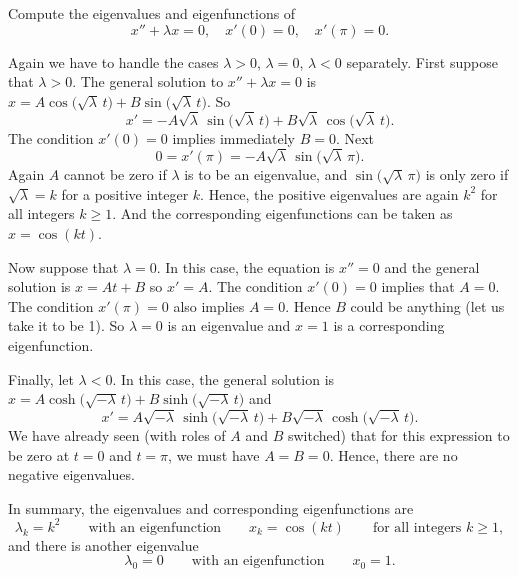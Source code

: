 \begin{example}
Compute the eigenvalues and eigenfunctions of
\begin{equation*}
x'' + \lambda x = 0, \quad x'(0) = 0, \quad x'(\pi) = 0 .
\end{equation*}

Again we have to handle the cases $\lambda > 0$, $\lambda = 0$, $\lambda
< 0$ separately.
First suppose that $\lambda > 0$.
The general solution to $x''+\lambda x = 0$ is
$x = A \cos \bigl( \sqrt{\lambda}\, t\bigr) + B \sin \bigl( \sqrt{\lambda}\,
t\bigr)$.
So
\begin{equation*}
x' = -A\sqrt{\lambda}\, \sin \bigl( \sqrt{\lambda}\, t\bigr) +
B\sqrt{\lambda}\, \cos \bigl(\sqrt{\lambda}\, t\bigr) .
\end{equation*}
The condition $x'(0) = 0$ implies immediately $B = 0$.
Next
\begin{equation*}
0 = x'(\pi) = -A\sqrt{\lambda}\, \sin \bigl( \sqrt{\lambda}\, \pi\bigr) .
\end{equation*}
Again $A$ cannot be zero if $\lambda$ is to be an eigenvalue,
and $\sin \bigl( \sqrt{\lambda}\, \pi\bigr)$ is only zero
if
$\sqrt{\lambda} = k$ for a positive integer $k$.
Hence, the positive eigenvalues are again
$k^2$ for all integers $k \geq 1$.  And the corresponding eigenfunctions
can be taken as $x=\cos (k t)$.

Now suppose that $\lambda = 0$.  In this case, the equation is $x'' = 0$
and the general solution is $x = At + B$ so $x' = A$.  The condition
$x'(0) = 0$ implies that
$A=0$.  The condition $x'(\pi) = 0$ also implies $A=0$.
Hence $B$ could be anything (let us take it to be 1).  So $\lambda = 0$
is an eigenvalue and $x=1$ is a corresponding eigenfunction.

Finally, let $\lambda < 0$.  In this case, the general solution is
$x = A \cosh \bigl( \sqrt{-\lambda}\, t\bigr)
+ B \sinh \bigl( \sqrt{-\lambda}\, t\bigr)$
and
\begin{equation*}
x' = A\sqrt{-\lambda}\, \sinh \bigl( \sqrt{-\lambda}\, t\bigr)
+ B\sqrt{-\lambda}\, \cosh \bigl( \sqrt{-\lambda}\, t \bigr) .
\end{equation*}
We have already seen (with roles of $A$ and $B$ switched) that for this
expression to be zero at $t=0$ and $t=\pi$, we must have $A=B=0$.
Hence, there are
no negative eigenvalues.

In summary, the eigenvalues and corresponding eigenfunctions are
\begin{equation*}
\lambda_k = k^2 \qquad \text{with an eigenfunction} \qquad x_k = \cos (k t)
\qquad \text{for all integers } k \geq 1 ,
\end{equation*}
and there is another eigenvalue
\begin{equation*}
\lambda_0 = 0 \qquad \text{with an eigenfunction} \qquad x_0 = 1.
\end{equation*}
\end{example}

